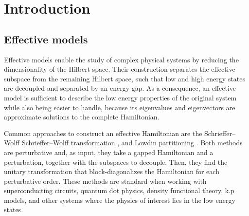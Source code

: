 \section{Introduction}

\subsection{Effective models}

Effective models enable the study of complex physical systems by reducing the
dimensionality of the Hilbert space.
Their construction separates the effective subspace from the remaining Hilbert
space, such that low and high energy states are decoupled and separated by an
energy gap.
As a consequence, an effective model is sufficient to describe the low energy
properties of the original system while also being easier to handle, because
its eigenvalues and eigenvectors are approximate solutions to the complete
Hamiltonian.

Common approaches to construct an effective Hamiltonian are the Schrieffer--Wolff
Schrieffer--Wolff transformation
\cite{Schrieffer_1966}, \cite{Bravyi_2011}
and Lowdin partitioning \cite{White_1950}.
Both methods are perturbative and, as input, they take a gapped Hamiltonian and
a perturbation, together with the subspaces to decouple.
Then, they find the unitary transformation that block-diagonalizes the
Hamiltonian for each perturbative order.
These methods are standard when working with superconducting circuits,
quantum dot physics, density functional theory, k.p models, and other
systems where the physics of interest lies in the low energy states.

